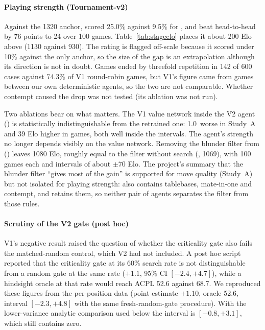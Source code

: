 \paragraph*{Playing strength (Tournament-v2)}
Against the 1320 anchor,  scored 25.0\% against 9.5\% for , and beat  head-to-head by 76 points to 24 over 100 games. Table~\ref{tab:stageelo} places it about 200 Elo above  (1130 against 930). The  rating is flagged off-scale because it scored under 10\% against the only anchor, so the size of the gap is an extrapolation although its direction is not in doubt. Games ended by threefold repetition in 142 of 600 cases against 74.3\% of V1 round-robin games, but V1's figure came from games between our own deterministic agents, so the two are not comparable. Whether contempt caused the drop was not tested (its ablation was not run).

Two ablations bear on what matters. The V1 value network inside the V2 agent () is statistically indistinguishable from the retrained one: 1.0\cp\ worse in Study~A and 39 Elo higher in games, both well inside the intervals. The agent's strength no longer depends visibly on the value network. Removing the blunder filter from  () leaves 1080 Elo, roughly equal to the filter without search (, 1069), with 100 games each and intervals of about $\pm70$ Elo. The project's summary that the blunder filter ``gives most of the gain'' is supported for move quality (Study~A) but not isolated for playing strength:  also contains tablebases, mate-in-one and contempt, and  retains them, so neither pair of agents separates the filter from those rules.

\paragraph*{Scrutiny of the V2 gate (post hoc)}
V1's negative result raised the question of whether the criticality gate also fails the matched-random control, which V2 had not included. A post hoc script reported that the criticality gate at its 60\% search rate is not distinguishable from a random gate at the same rate ($+1.1$\cp, 95\% CI $[-2.4,+4.7]$), while a hindsight oracle at that rate would reach ACPL 52.6 against 68.7. We reproduced these figures from the per-position data (point estimate $+1.10$, oracle 52.6, interval $[-2.3,+4.8]$ with the same fresh-random-gate procedure). With the lower-variance analytic comparison used below the interval is $[-0.8,+3.1]$, which still contains zero.

